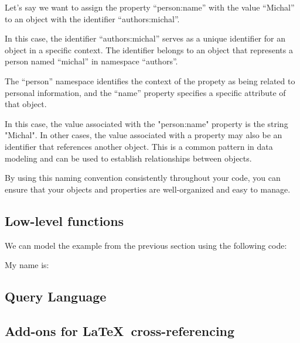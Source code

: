 \documentclass{ltxdoc}
\begin{document}
Let's say we want to assign the property \enquote{person:name} with the value \enquote{Michal}
to an object with the identifier \enquote{authors:michal}. 


In this case, the identifier \enquote{authors:michal} serves as a unique
identifier for an object in a specific context. The identifier
belongs to an object that represents a person named \enquote{michal} in namespace \enquote{authors}.

The \enquote{person} namespace identifies the context of the propety as
being related to personal information, and the \enquote{name} property specifies a
specific attribute of that object. 

In this case, the value associated with the "person:name" property is the
string "Michal". In other cases, the value associated with a property may also
be an identifier that references another object. This is a common pattern in
data modeling and can be used to establish relationships between objects.


By using this naming convention consistently
throughout your code, you can ensure that your objects and properties are
well-organized and easy to manage.





\subsection{Low-level functions}


We can model the example from the previous section using the following code:

\begin{LTXexample}[pos=b]
  My name is: 

\end{LTXexample}


\subsection{Query Language}

\subsection{Add-ons for \LaTeX\ cross-referencing}
\end{document}
